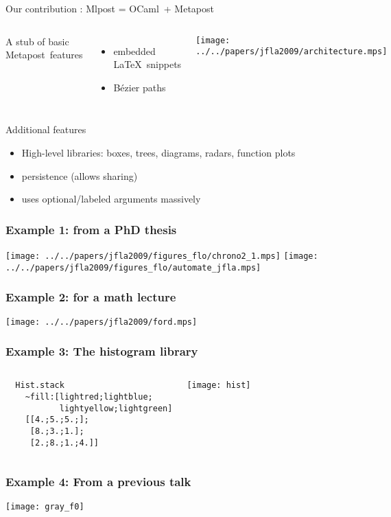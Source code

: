 \documentclass[nodefaultblocks]{beamer}
\newcommand{\ocaml}{OCaml}
\newcommand{\metapost}{Metapost}
\begin{document}
\begin{frame}{Our contribution : Mlpost = \ocaml\ + \metapost}

  \begin{columns}
  A stub of basic \metapost\ features
  \begin{itemize}
    \item embedded \LaTeX\ snippets
      \item Bézier paths
  \end{itemize}

  \texttt{[image: ../../papers/jfla2009/architecture.mps]}
  \end{columns}
  \bigskip
  Additional features
  \begin{itemize}
    \item High-level libraries: boxes, trees, diagrams, radars, function plots
  \item persistence (allows sharing) 
  \item uses optional/labeled arguments massively
  \end{itemize}

\end{frame}

\begin{frame}
  \frametitle{Example 1: from a PhD thesis}
  \texttt{[image: ../../papers/jfla2009/figures\_flo/chrono2\_1.mps]}
  \texttt{[image: ../../papers/jfla2009/figures\_flo/automate\_jfla.mps]}
\end{frame}

\begin{frame}
\frametitle{Example 2: for a math lecture}
\begin{center}
  \texttt{[image: ../../papers/jfla2009/ford.mps]} 
\end{center}
\end{frame}

\begin{frame}[fragile]
\frametitle{Example 3: The histogram library}
\begin{columns}
\begin{verbatim}
  Hist.stack 
    ~fill:[lightred;lightblue;
           lightyellow;lightgreen]
    [[4.;5.;5.;]; 
     [8.;3.;1.]; 
     [2.;8.;1.;4.]]  
\end{verbatim}
\begin{center}
  \texttt{[image: hist]}
\end{center}

\end{columns}

\end{frame}
\begin{frame}
\frametitle{Example 4: From a previous talk}

\begin{center}
\texttt{[image: gray\_f0]}
\end{center}
\end{frame}
\end{document}
